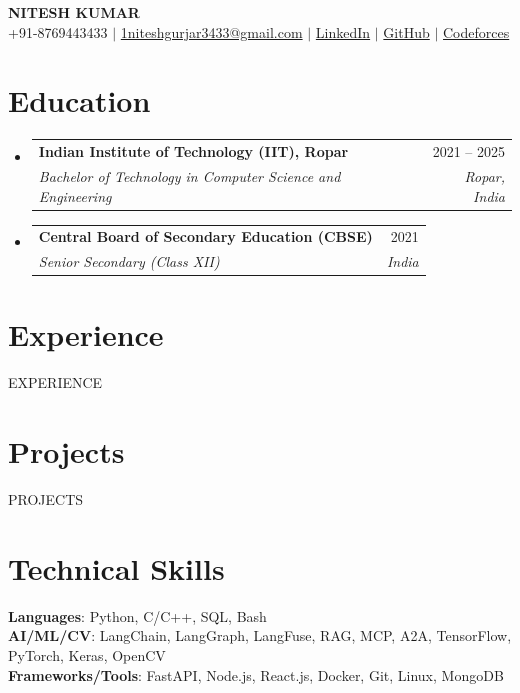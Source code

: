 \documentclass[a4paper,11pt]{article}
\makeatletter
\newcommand{\resumeSubheading}[4]{
  \vspace{2pt}\item
    \begin{tabular*}{0.97\textwidth}[t]{l@{\extracolsep{\fill}}r}
      \textbf{#1} & #2 \\
      \textit{\small#3} & \textit{\small #4} \\
    \end{tabular*}\vspace{-8pt}
}
\newcommand{\resumeSubHeadingListStart}{\begin{itemize}[leftmargin=0.1in, label={}]}
\newcommand{\resumeSubHeadingListEnd}{\end{itemize}}
\makeatother
\begin{document}
\begin{center}
    \textbf{\Huge NITESH KUMAR} \\ \vspace{3pt}
    \small +91-8769443433 $|$ \href{mailto:1niteshgurjar3433@gmail.com}{1niteshgurjar3433@gmail.com} $|$ 
    \href{https://linkedin.com/in/nitesh-kumar-gurjar/}{LinkedIn} $|$ \href{https://github.com/nk-gujjar}{GitHub} $|$ \href{https://codeforces.com/profile/Mr.BruceWayne}{Codeforces}
\end{center}

\section{Education}
  \resumeSubHeadingListStart
    \resumeSubheading
      {Indian Institute of Technology (IIT), Ropar}{2021 -- 2025}
      {Bachelor of Technology in Computer Science and Engineering}{Ropar, India}
    \resumeSubheading
      {Central Board of Secondary Education (CBSE)}{2021}
      {Senior Secondary (Class XII)}{India}
  \resumeSubHeadingListEnd

\section{Experience}
{{EXPERIENCE}}

\section{Projects}
{{PROJECTS}}

\section{Technical Skills}
\begin{itemize}[leftmargin=0.15in, label={}, itemsep=4pt, parsep=0pt]
    \small{\item{
     \textbf{Languages}{: Python, C/C++, SQL, Bash} \\
     \textbf{AI/ML/CV}{: LangChain, LangGraph, LangFuse, RAG, MCP, A2A, TensorFlow, PyTorch, Keras, OpenCV} \\
     \textbf{Frameworks/Tools}{: FastAPI, Node.js, React.js, Docker, Git, Linux, MongoDB}
    }}
 \end{itemize}

\end{document}
